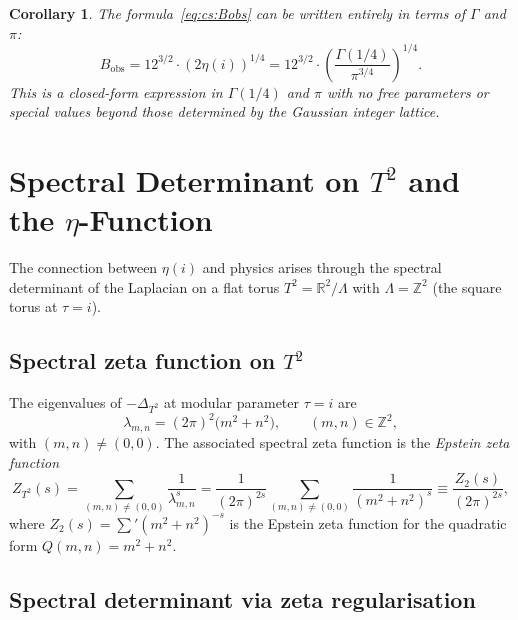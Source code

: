 \documentclass[12pt,a4paper]{article}
\newtheorem{corollary}[theorem]{Corollary}
\theoremstyle{definition}
\theoremstyle{remark}
\begin{document}
\begin{corollary}\label{cor:cs:Bobs}
  The formula~\eqref{eq:cs:Bobs} can be written entirely in terms of $\Gamma$
  and $\pi$:
  \begin{equation}
    B_{\mathrm{obs}}
    = 12^{3/2}\cdot(2\eta(i))^{1/4}
    = 12^{3/2}\cdot\left(\frac{\Gamma(1/4)}{\pi^{3/4}}\right)^{1/4}.
    \label{eq:cs:BobsGamma}
  \end{equation}
  This is a closed-form expression in $\Gamma(1/4)$ and $\pi$ with no free
  parameters or special values beyond those determined by the Gaussian integer
  lattice.
\end{corollary}

\section{Spectral Determinant on $T^2$ and the $\eta$-Function}
\label{sec:cs:spectral}

The connection between $\eta(i)$ and physics arises through the spectral
determinant of the Laplacian on a flat torus $T^2 = \mathbb{R}^2/\Lambda$
with $\Lambda = \mathbb{Z}^2$ (the square torus at $\tau = i$).

\subsection{Spectral zeta function on $T^2$}

The eigenvalues of $-\Delta_{T^2}$ at modular parameter $\tau = i$ are
\[
  \lambda_{m,n} = (2\pi)^2\bigl(m^2 + n^2\bigr), \qquad (m,n)\in\mathbb{Z}^2,
\]
with $(m,n) \neq (0,0)$.  The associated spectral zeta function is the
\emph{Epstein zeta function}
\begin{equation}
  Z_{T^2}(s) = \sum_{(m,n)\neq(0,0)} \frac{1}{\lambda_{m,n}^s}
  = \frac{1}{(2\pi)^{2s}} \sum_{(m,n)\neq(0,0)} \frac{1}{(m^2+n^2)^s}
  \equiv \frac{Z_2(s)}{(2\pi)^{2s}},
  \label{eq:cs:zetaT2}
\end{equation}
where $Z_2(s) = \sum'(m^2+n^2)^{-s}$ is the Epstein zeta function for
the quadratic form $Q(m,n) = m^2 + n^2$.

\subsection{Spectral determinant via zeta regularisation}
\end{document}
